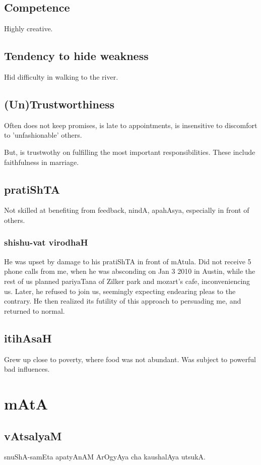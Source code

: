 \documentclass[oneside, article]{memoir}
\begin{document}
\section{Competence}
Highly creative.

\section{Tendency to hide weakness}
Hid difficulty in walking to the river.

\section{(Un)Trustworthiness}
Often does not keep promises, is late to appointments, is insensitive to discomfort to 'unfashionable' others.

But, is trustwothy on fulfilling the most important responsibilities. These include faithfulness in marriage.

\section{pratiShTA}
Not skilled at benefiting from feedback, nindA, apahAsya, especially in front of others.

\subsection{shishu-vat virodhaH}
He was upset by damage to his pratiShTA in front of mAtula. Did not receive 5 phone calls from me, when he was absconding on Jan 3 2010 in Austin, while the rest of us planned pariyaTana of Zilker park and mozart's cafe, inconveniencing us. Later, he refused to join us, seemingly expecting endearing pleas to the contrary. He then realized its futility of this approach to persuading me, and returned to normal.

\section{itihAsaH}
Grew up close to poverty, where food was not abundant. Was subject to powerful bad influences.

\chapter{mAtA}
\section{vAtsalyaM}
snuShA-samEta apatyAnAM ArOgyAya cha kaushalAya utsukA.
\end{document}
